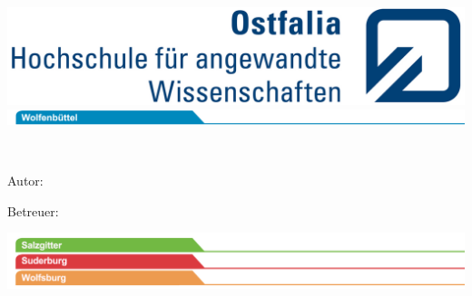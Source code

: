 \frontmatter

\begin{titlepage}
	\vspace*{-1cm}
	
	\hspace{6.90cm}
	\includegraphics[scale=0.93]{Bilder/ostfalia_logo.jpg}\\
	
	\hspace{-1.00cm}
	\includegraphics[scale=1.20]{Bilder/reiter_wf_174mm.jpg}\\
	
	
	\vfil
	\hrulefill
	
	
	{\Large\textbf{\textsf{\documentsubject}}}
	
	\vspace{2em}
	
	{\Huge\textbf{\textsf{\documenttitle}}}
	
	\vspace{2em}
	
	{\Large\textsf{\documentsubtitle}}
	
	\hrulefill\\
	
	
	\vfil
	
	{\Large\textsf{Autor: \documentauthor}}
	
	\vspace{1em}
	
	{\Large\textsf{Betreuer: \documenttutor}}
	
	\vspace{2em}
	
	
	\enlargethispage{10\baselineskip}
	
	\hspace*{-1.00cm}\includegraphics[scale=1.20]{Bilder/reiter_szsudwob_174mm.jpg}
	\vspace*{2cm}
	
	
\end{titlepage}